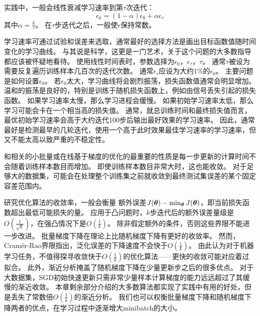 
实践中，一般会线性衰减学习速率到第$\tau$次迭代：
\begin{equation}
\label{eq:8.14}
    \epsilon_k = (1-\alpha) \epsilon_0 + \alpha \epsilon_\tau
\end{equation}
其中$\alpha = \frac{k}{\tau}$。
在$\tau$步迭代之后，一般使$\epsilon$保持常数。

学习速率可通过试验和误差来选取，通常最好的选择方法是画出目标函数值随时间变化的学习曲线。
与其说是科学，这更是一门艺术，关于这个问题的大多数指导都应该被怀疑地看待。
使用线性时间表时，参数选择为$\epsilon_0$，$\epsilon_\tau$，$\tau$。  
通常$\tau$被设为需要反复遍历训练样本几百次的迭代次数。
通常$\epsilon_\tau$应设为大约$1\%$的$\epsilon_0$。
主要问题是如何设置$\epsilon_0$。
若$\epsilon_0$太大，学习曲线将会剧烈振荡，损失函数值通常会明显增加。
温和的振荡是良好的，特别是训练于随机损失函数上，例如由信号丢失引起的损失函数。
如果学习速率太慢，那么学习进程会缓慢。
如果初始学习速率太低，那么学习可能会卡在一个相当高的损失值。
通常，就总训练时间和最终损失值而言，最优初始学习速率会高于大约迭代100步后输出最好效果的学习速率。
因此，通常最好是检测最早的几轮迭代，使用一个高于此时效果最佳学习速率的学习速率，但又不能太高以致严重的不稳定性。  

和相关的小批量或在线基于梯度的优化的最重要的性质是每一步更新的计算时间不会随着训练样本数目而增加。
即使训练样本数目非常大时，这也能收敛。
对于足够大的数据集，可能会在处理整个训练集之前就收敛到最终测试集误差的某个固定容差范围内。

研究优化算法的收敛率，一般会衡量 额外误差$J(\boldsymbol{\theta}) - \min_{\boldsymbol{\theta}} J(\boldsymbol{\theta})$，即当前损失函数超出最低可能损失的量。
应用于凸问题时，$k$步迭代后的额外误差量级是$O(\frac{1}{\sqrt{k}})$，在强凸情况下是$O(\frac{1}{k})$。
除非假定额外的条件，否则这些界限不能进一步改进。
批量梯度下降在理论上比随机梯度下降有更好的收敛率。
然而，Cram\'er-Rao界限\citep{Cramer-1946,Rao-1945}指出，泛化误差的下降速度不会快于$O(\frac{1}{k})$。
\cite{bottou-bousquet-2008-small}由此认为对于机器学习任务，不值得探寻收敛快于$O(\frac{1}{k})$的优化算法——更快的收敛可能对应着过拟合。
此外，渐近分析掩盖了随机梯度下降在少量更新步之后的很多优点。
对于大数据集，SGD初始快速更新只需非常少量样本计算梯度的能力远远超过了其缓慢的渐近收敛。
本章剩余部分介绍的大多数算法都实现了实践中有用的好处，但是丢失了常数倍$O(\frac{1}{k})$的渐近分析。
我们也可以权衡批量梯度下降和随机梯度下降两者的优点，在学习过程中逐渐增大\gls{minibatch}的大小。



